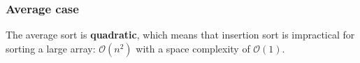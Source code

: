 \documentclass[11pt]{article}
\begin{document}
\subsubsection{Average case}
\label{sec-2-1-3}
The average sort is \textbf{quadratic}, which means that insertion sort is impractical
for sorting a large array: $\mathcal{O}(n^2)$ with a space complexity of $\mathcal{O}(1)$.
\end{document}
